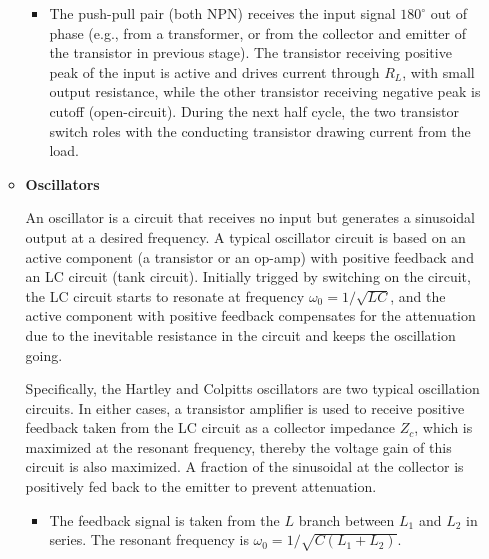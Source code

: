 \begin{itemize}
\begin{itemize}
\begin{itemize}
  \item The push-pull pair (both NPN) receives the input signal $180^\circ$ 
    out of phase (e.g., from a transformer, or from the collector and emitter
    of the transistor in previous stage). The transistor receiving positive
    peak of the input is active and drives current through $R_L$, with small
    output resistance, while the other transistor receiving negative peak 
    is cutoff (open-circuit). During the next half cycle, the two transistor 
    switch roles with the conducting transistor drawing current from the load.
    
  \end{itemize}





\item {\bf Oscillators}

  An oscillator is a circuit that receives no input but generates a sinusoidal 
  output at a desired frequency. A typical oscillator circuit is based on an
  active component (a transistor or an op-amp) with positive feedback and an 
  LC circuit (tank circuit). Initially trigged by switching on the circuit, 
  the LC circuit starts to resonate at frequency $\omega_0=1/\sqrt{LC}$, and 
  the active component with positive feedback compensates for the attenuation 
  due to the inevitable resistance in the circuit and keeps the oscillation 
  going.

  Specifically, the Hartley and Colpitts oscillators are two typical oscillation
  circuits. In either cases, a transistor amplifier is used to receive positive 
  feedback taken from the LC circuit as a collector impedance $Z_c$, which is 
  maximized at the resonant frequency, thereby the voltage gain of this circuit 
  is also maximized. A fraction of the sinusoidal at the collector is positively 
  fed back to the emitter to prevent attenuation.
  
  \begin{itemize}
  \item {}
    The feedback signal is taken from the $L$ branch between $L_1$ and $L_2$ in series.
    The resonant frequency is $\omega_0=1/\sqrt{C(L_1+L_2)}$.



\end{itemize}
\end{itemize}
\end{itemize}
